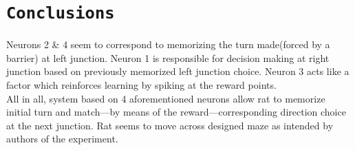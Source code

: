 \documentclass[12pt,a4paper,twocolumn]{article}
\begin{document}
\section*{\texttt{Conclusions}}
Neurons 2 \& 4 seem to correspond to memorizing the turn made(forced by a barrier) at left junction. Neuron 1 is responsible for decision making at right junction based on previously memorized left junction choice. Neuron 3 acts like a factor which reinforces learning by spiking at the reward points.\\
All in all, system based on 4 aforementioned neurons allow rat to memorize initial turn and match---by means of the reward---corresponding direction choice at the next junction. Rat seems to move across designed maze as intended by authors of the experiment.\\
\end{document}
